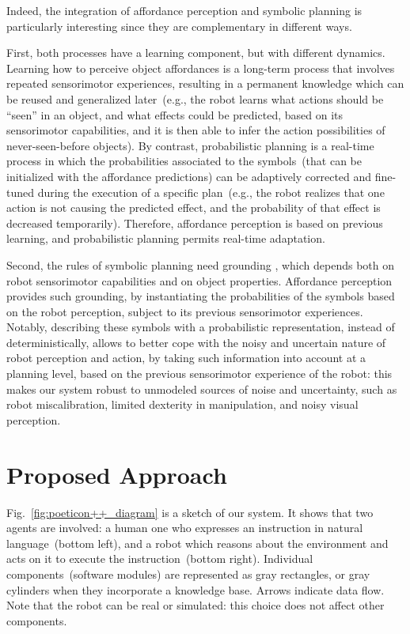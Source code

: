 Indeed, the integration of affordance perception and symbolic planning is particularly interesting since they are complementary in different ways.

First, both processes have a learning component, but with different dynamics.
Learning how to perceive object affordances is a long-term process that involves repeated sensorimotor experiences, resulting in
a permanent knowledge which can be reused and generalized later~(e.g., the robot learns what actions should be ``seen'' in an object, and what effects could be predicted, based on its sensorimotor capabilities, and it is then able to infer the action possibilities of never-seen-before objects).
By contrast, probabilistic planning is a real-time process in which the probabilities associated to the symbols~(that can be initialized with the affordance predictions) can be adaptively corrected and fine-tuned during the execution of a specific plan~(e.g., the robot realizes that one action is not causing the predicted effect, and the probability of that effect is decreased temporarily).
Therefore, affordance perception is based on previous learning, and probabilistic planning permits real-time adaptation.

Second, the rules of symbolic planning need grounding \cite{konidaris:2014:aaai,konidaris:2018:jair}, which depends both on robot sensorimotor capabilities and on object properties.
Affordance perception provides such grounding, by instantiating the probabilities of the symbols based on the robot perception, subject to its previous sensorimotor experiences.
Notably, describing these symbols with a probabilistic representation, instead of deterministically, allows to better cope with the noisy and uncertain nature of robot perception and action, by taking such information into account at a planning level, based on the previous sensorimotor experience of the robot: this makes our system robust to unmodeled sources of noise and uncertainty, such as robot miscalibration, limited dexterity in manipulation, and noisy visual perception.

\section{Proposed Approach}
\label{sec:poeticon++:proposed_approach}

Fig.~\ref{fig:poeticon++_diagram} is a sketch of our system.
It shows that two agents are involved: a human one who expresses an instruction in natural language~(bottom left), and a robot which reasons about the environment and acts on it to execute the instruction~(bottom right).
Individual components~(software modules) are represented as gray rectangles, or gray cylinders when they incorporate a knowledge base.
Arrows indicate data flow.
Note that the robot can be real or simulated: this choice does not affect other components.

